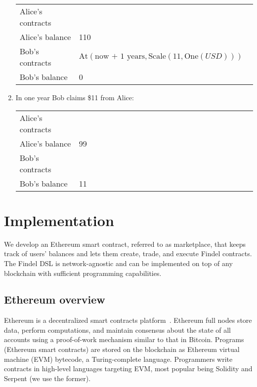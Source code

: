 \begin{enumerate}
	\begin{tabular}{| p{0.25\linewidth} | p{0.75\linewidth} |}
		\hline
		Alice's contracts & \\
		Alice's balance & 110 \\
		Bob's contracts & \(\mathrm{At}(\text{now + 1 years},\mathrm{Scale}(11,\mathrm{One}(USD)))\) \\
		Bob's balance & 0 \\
		\hline    
	\end{tabular}
	
	\item In one year Bob claims \$11 from Alice:
	
	\begin{tabular}{| p{0.25\linewidth} | p{0.75\linewidth} |}
		\hline
		Alice's contracts & \\
		Alice's balance & 99\\
		Bob's contracts & \\
		Bob's balance & 11\\
		\hline    
	\end{tabular}
	
\end{enumerate}




\section{Implementation} \label{sec:Ch10_Findel_Implementation}

We develop an Ethereum smart contract, referred to as marketplace, that keeps track of users' balances and lets them create, trade, and execute Findel contracts.
The Findel DSL is network-agnostic and can be implemented on top of any blockchain with sufficient programming capabilities.


\subsection{Ethereum overview}

Ethereum is a decentralized smart contracts platform~\cite{Buterin2014, Wood2014}.
Ethereum full nodes store data, perform computations, and maintain consensus about the state of all accounts using a proof-of-work mechanism similar to that in Bitcoin.
Programs (Ethereum smart contracts) are stored on the blockchain as Ethereum virtual machine (EVM) bytecode, a Turing-complete language.
Programmers write contracts in high-level languages targeting EVM, most popular being Solidity and Serpent (we use the former).

